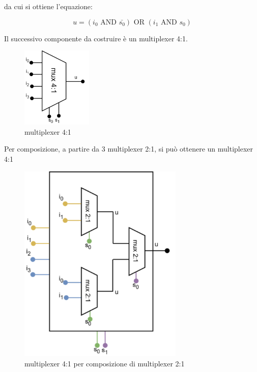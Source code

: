 da cui si ottiene l'equazione:
\begin{center}
    \begin{equation*}
          u = (i_0 \text{ AND } \bar{s_0}) \text{ OR } (i_1 \text{ AND } s_0)
    \end{equation*}
\end{center}
Il successivo componente da costruire è un multiplexer 4:1.
\begin{figure}[H]
	\centering
	\includegraphics[width=0.3\textwidth]{img/mux_4-1}
	\caption{multiplexer 4:1}
	\label{mux_4:1} 
\end{figure}
Per composizione, a partire da 3 multiplexer 2:1, si può ottenere un multiplexer 4:1
\begin{figure}[H]
	\centering
	\includegraphics[width=0.7\textwidth]{img/mux_4-1_comp}
	\caption{multiplexer 4:1 per composizione di multiplexer 2:1}
	\label{mux_4:1_comp} 
\end{figure}
